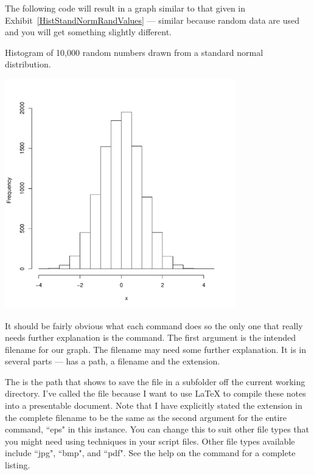The following code will result in a graph similar to that given in Exhibit~\ref{HistStandNormRandValues} --- similar because random data are used and you will get something slightly different.\begin{exhibit} 
\begin{center} 
\caption{Histogram of 10,000 random numbers drawn from a standard normal distribution. \label{HistStandNormRandValues}} 
\includegraphics[width=10cm]{figures/StoreResultsHistRand10000Z-1} 

\end{center} 
\end{exhibit} 



 
It should be fairly obvious what each command does so the only one that really needs further explanation is the  command. The first argument is the intended filename for our graph. The filename may need some further explanation. It is in several parts ---  has a path, a filename and the extension. 
 
The  is the path that shows \R{} to save the file in a subfolder off the current working directory. I've called the file  because I want to use \LaTeX{} to compile these notes into a presentable document. 
Note that I have explicitly stated the extension in the complete filename to be the same as the second argument for the entire command, ``eps" in this instance. You can change this to suit other file types that you might need using  techniques in your script files. Other file types available include ``jpg", ``bmp", and ``pdf". See the help on the  command for a complete listing. 
 
